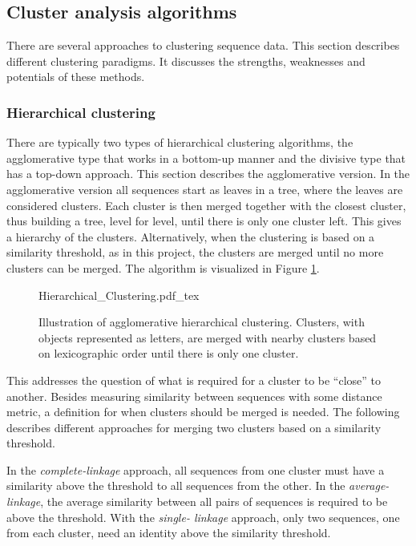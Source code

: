 \subsection{Cluster analysis algorithms}

There are several approaches to clustering sequence data. This section
describes different clustering paradigms. It discusses the strengths,
weaknesses and potentials of these methods.

\subsubsection{Hierarchical clustering}

There are typically two types of hierarchical clustering algorithms, the
agglomerative type that works in a bottom-up manner and the divisive type that
has a top-down approach. This section describes the agglomerative version. In
the agglomerative version all sequences start as leaves in a tree, where the
leaves are considered clusters. Each cluster is then merged together with the
closest cluster, thus building a tree, level for level, until there is only one
cluster left. This gives a hierarchy of the clusters. Alternatively, when the
clustering is based on a similarity threshold, as in this project, the clusters
are merged until no more clusters can be merged. The algorithm is visualized in
Figure \ref{fig:hierarchical_clustering}.

\begin{figure}[h!]
  \centering
  \def\svgwidth{\columnwidth}
  {Hierarchical_Clustering.pdf_tex}
  \caption{Illustration of agglomerative hierarchical clustering. Clusters,
    with objects represented as letters, are merged with nearby clusters based
    on lexicographic order until there is only one cluster.}
  \label{fig:hierarchical_clustering}
\end{figure}

This addresses the question of what is required for a cluster to be ``close''
to another. Besides measuring similarity between sequences with some distance
metric, a definition for when clusters should be merged is needed. The
following describes different approaches for merging two clusters based on a
similarity threshold.

In the \textit{complete-linkage} approach, all sequences from one cluster must
have a similarity above the threshold to all sequences from the other. In the
\textit{average-linkage}, the average similarity between all pairs of
sequences is required to be above the threshold. With the \textit{single-
linkage} approach, only two sequences, one from each cluster, need an identity
above the similarity threshold.

